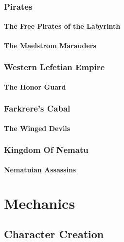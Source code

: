 \documentclass[letterpaper,twocolumn,openany,nodeprecatedcode]{dndbook}
\begin{document}
\section{Pirates}

    \subsection{The Free Pirates of the Labyrinth}
    
    
    \subsection{The Maelstrom Marauders}
    

\section{Western Lefetian Empire}
    \subsection{The Honor Guard}


\section{Farkrere's Cabal}
    
    \subsection{}
    
    \subsection{The Winged Devils}


\section{Kingdom Of Nematu}
    \subsection{Nematuian Assassins}




\part{Mechanics}


\chapter{Character Creation}
\end{document}
